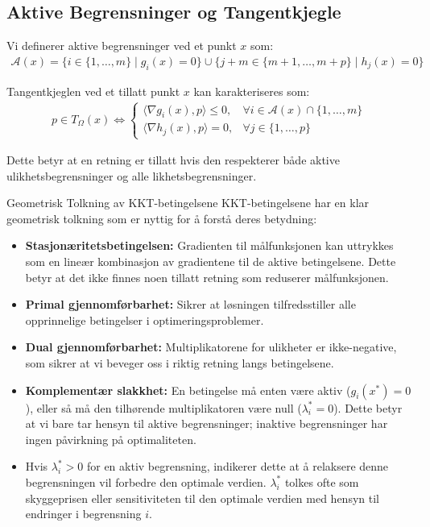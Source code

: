 \subsection{Aktive Begrensninger og Tangentkjegle}

Vi definerer aktive begrensninger ved et punkt $x$ som:
\begin{align*}
	\mathcal{A}(x) = \{i \in \{1,\ldots,m\} \mid g_i(x) = 0\} \cup \{j+m \in \{m+1,\ldots,m+p\} \mid h_j(x) = 0\}
\end{align*}

Tangentkjeglen ved et tillatt punkt $x$ kan karakteriseres som:
\begin{align*}
	p \in T_{\Omega}(x) \Longleftrightarrow
	\begin{cases}
		\langle \nabla g_i(x), p \rangle \leq 0, & \forall i \in \mathcal{A}(x) \cap \{1,\ldots,m\} \\
		\langle \nabla h_j(x), p \rangle = 0,    & \forall j \in \{1,\ldots,p\}
	\end{cases}
\end{align*}

Dette betyr at en retning er tillatt hvis den respekterer både aktive ulikhetsbegrensninger og alle likhetsbegrensninger.

\begin{remark}{Geometrisk Tolkning av KKT-betingelsene}{}
	KKT-betingelsene har en klar geometrisk tolkning som er nyttig for å forstå deres betydning:

	\begin{itemize}
		\item \textbf{Stasjonæritetsbetingelsen:} Gradienten til målfunksjonen kan uttrykkes som en lineær kombinasjon av gradientene til de aktive betingelsene. Dette betyr at det ikke finnes noen tillatt retning som reduserer målfunksjonen.

		\item \textbf{Primal gjennomførbarhet:} Sikrer at løsningen tilfredsstiller alle opprinnelige betingelser i optimeringsproblemer.

		\item \textbf{Dual gjennomførbarhet:} Multiplikatorene for ulikheter er ikke-negative, som sikrer at vi beveger oss i riktig retning langs betingelsene.

		\item \textbf{Komplementær slakkhet:} En betingelse må enten være aktiv ($g_i(x^*) = 0$), eller så må den tilhørende multiplikatoren være null ($\lambda_i^* = 0$). Dette betyr at vi bare tar hensyn til aktive begrensninger; inaktive begrensninger har ingen påvirkning på optimaliteten.

		\item Hvis $\lambda_i^* > 0$ for en aktiv begrensning, indikerer dette at å relaksere denne begrensningen vil forbedre den optimale verdien. $\lambda_i^*$ tolkes ofte som skyggeprisen eller sensitiviteten til den optimale verdien med hensyn til endringer i begrensning $i$.
	\end{itemize}
\end{remark}

